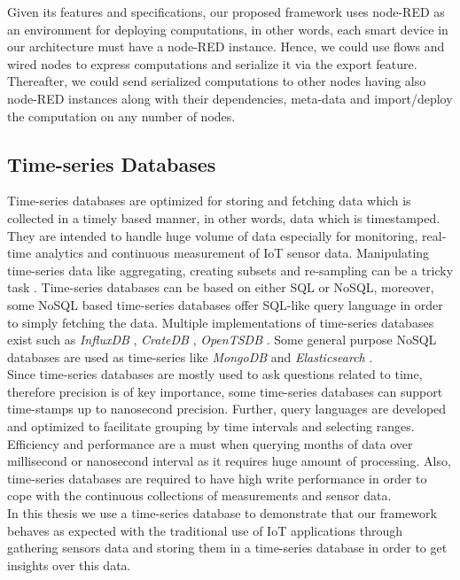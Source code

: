 \noindent Given its features and specifications, our proposed framework uses node-RED as an environment for deploying computations, in other words, each smart device in our architecture must have a node-RED instance. Hence, we could use  flows and wired nodes to express computations and serialize it via the export feature. Thereafter, we could send serialized computations to other nodes having also node-RED instances along with their dependencies, meta-data and import/deploy the computation on any number of nodes. 

\subsection{Time-series Databases}

Time-series databases are optimized for storing  and fetching data which is collected in a timely based manner, in other words, data which is timestamped. They are intended to handle huge volume of data especially for monitoring, real-time analytics and continuous measurement of IoT sensor data. Manipulating time-series data like aggregating, creating subsets and re-sampling can be a tricky task \cite{Leighton2015}. Time-series databases can be based on either SQL or NoSQL, moreover, some NoSQL based time-series databases offer SQL-like query language in order to simply fetching the data. Multiple implementations of time-series databases exist such as \textit{InfluxDB} \cite{Influxdb}, \textit{CrateDB } \cite{CrateDB},  \textit{OpenTSDB} \cite{Opentsdb}. Some general purpose NoSQL databases are used as time-series  like \textit{MongoDB} \cite{MongoDB} and \textit{Elasticsearch} \cite{Elasticsearch}.\\

\noindent Since time-series databases are mostly used to ask questions related to time, therefore precision is of key importance, some time-series databases can support time-stamps up to nanosecond precision. Further, query languages are developed and optimized to facilitate grouping by time intervals and selecting ranges. Efficiency and performance are a must when querying months of data over millisecond or nanosecond interval as it requires huge amount of processing. Also, time-series databases are required to have high write performance in order to cope with the continuous collections of measurements and sensor data.  \\

\noindent In this thesis we use a time-series database to demonstrate that our framework behaves as expected with the traditional use of IoT applications through gathering sensors data  and storing them in a time-series database in order to get insights over this data.
 


